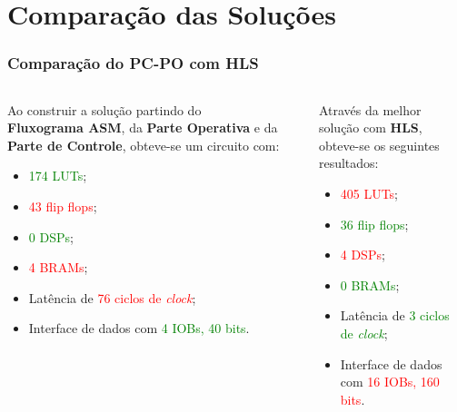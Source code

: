 \documentclass{beamer}
\begin{document}
    \section{Comparação das Soluções}
    \begin{frame}
        \frametitle{Comparação do PC-PO com HLS}
        \begin{columns}
            \begin{column}{0.49\textwidth}
                Ao construir a solução partindo do \textbf{Fluxograma ASM},
                da \textbf{Parte Operativa} e da \textbf{Parte de Controle},
                obteve-se um circuito com:

                \begin{itemize}
                    \item \textcolor<3->{green}{174 LUTs};
                    \item \textcolor<3->{red}{43 flip flops};
                    \item \textcolor<3->{green}{0 DSPs};
                    \item \textcolor<3->{red}{4 BRAMs};
                    \item Latência de \textcolor<3->{red}{76 ciclos de \textit{clock}};
                    \item Interface de dados com \textcolor<3->{green}{4 IOBs, 40 bits}.
                \end{itemize}

            \end{column}

            \begin{column}{0.02\textwidth}
                \rule{.1mm}{0.65\textheight}
            \end{column}
            \begin{column}{0.49\textwidth}
                Através da melhor solução com \textbf{HLS}, obteve-se os
                seguintes resultados:

                \begin{itemize}
                    \item \textcolor<3->{red}{405 LUTs};
                    \item \textcolor<3->{green}{36 flip flops};
                    \item \textcolor<3->{red}{4 DSPs};
                    \item \textcolor<3->{green}{0 BRAMs};
                    \item Latência de \textcolor<3->{green}{3 ciclos de \textit{clock}};
                    \item Interface de dados com \textcolor<3->{red}{16 IOBs, 160 bits}.
                \end{itemize}


\end{column}
\end{columns}
\end{frame}
\end{document}
